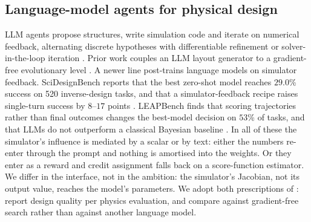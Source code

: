 \subsection{Language-model agents for physical design}
\label{sec:rw-llm}
LLM agents propose structures, write simulation code and iterate on numerical
feedback, alternating discrete hypotheses with differentiable refinement or
solver-in-the-loop iteration
\cite{ma2024sga,jadhav2026mechdesigner,li2026dctwin,chang2023chipnemo,boiko2023autonomous}.
Prior work couples an LLM layout generator to a gradient-free
evolutionary level \cite{phythesis2025}.  A newer line post-trains language
models on simulator feedback.  SciDesignBench reports that the best zero-shot
model reaches $29.0$\% success on 520 inverse-design tasks, and that a
simulator-feedback recipe raises single-turn success by $8$--$17$ points
\cite{scidesignbench2026}.  LEAPBench finds that scoring trajectories rather
than final outcomes changes the best-model decision on $53$\% of tasks, and
that LLMs do not outperform a classical Bayesian baseline
\cite{zhang2026leap}.  In all of these the simulator's influence is mediated by
a scalar or by text: either the numbers re-enter through the prompt and nothing
is amortised into the weights. Or they enter as a reward and credit assignment
falls back on a score-function estimator.  We differ in the interface, not in
the ambition: the simulator's Jacobian, not its output value, reaches the
model's parameters.  We adopt both prescriptions of \cite{zhang2026leap}:
report design quality per physics evaluation, and compare against
gradient-free search rather than against another language model.

